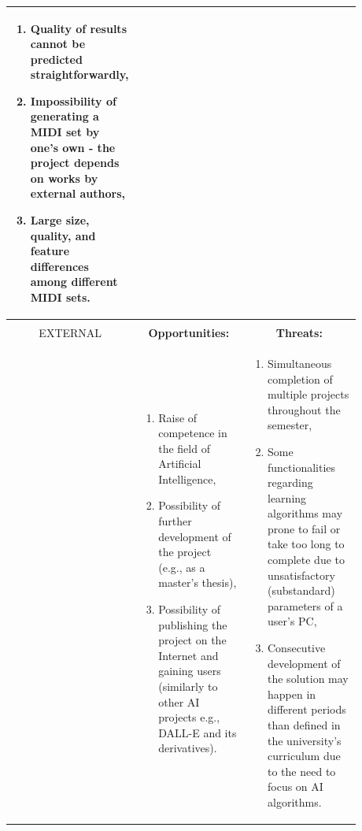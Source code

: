 \documentclass{article}
\begin{document}
\begin{center}
\begin{tabular}{ |p{0.15\linewidth}|p{0.365\linewidth}|p{0.365\linewidth}| }
\begin{enumerate}
            \item Quality of results cannot be predicted straightforwardly,
            \item Impossibility of generating a MIDI set by one's own - the project depends on works by external authors,
            \item Large size, quality, and feature differences among different MIDI sets.
        \end{enumerate}                                                                                 \\
        \hline
                                                                                                                                                         &                                               &                                            \\
        \multicolumn{1}{|c|}{EXTERNAL}                                                                                                                   & \multicolumn{1}{|c|}{\textbf{Opportunities:}} & \multicolumn{1}{|c|}{\textbf{Threats:}}    \\
                                                                                                                                                         &
        \begin{enumerate}
            \item Raise of competence in the field of Artificial Intelligence,
            \item Possibility of further development of the project (e.g., as a master's thesis),
            \item Possibility of publishing the project on the Internet and gaining users (similarly to other AI projects e.g., DALL-E and its derivatives).
        \end{enumerate} &
        \begin{enumerate}
            \item Simultaneous completion of multiple projects throughout the semester,
            \item Some functionalities regarding learning algorithms may prone to fail or take too long to complete due to unsatisfactory (substandard) parameters of a user's PC,
            \item Consecutive development of the solution may happen in different periods than defined in the university's curriculum due to the need to focus on AI algorithms.
        \end{enumerate}                                                                         \\
        \hline
    \end{tabular}
\end{center}
\end{document}
